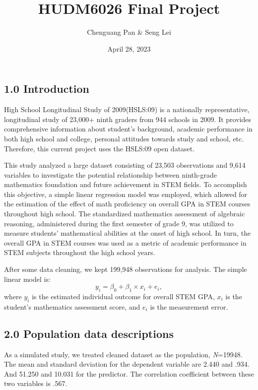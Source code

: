 \documentclass[
]{article}
\title{HUDM6026 Final Project}
\author{Chenguang Pan \& Seng Lei}
\date{April 28, 2023}
\begin{document}
\maketitle

\hypertarget{introduction}{%
\subsection{1.0 Introduction}\label{introduction}}

High School Longitudinal Study of 2009(HSLS:09) is a nationally
representative, longitudinal study of 23,000+ ninth graders from 944
schools in 2009. It provides comprehensive information about student's
background, academic performance in both high school and college,
personal attitudes towards study and school, etc. Therefore, this
current project uses the HSLS:09 open dataset.

This study analyzed a large dataset consisting of 23,503 observations
and 9,614 variables to investigate the potential relationship between
ninth-grade mathematics foundation and future achievement in STEM
fields. To accomplish this objective, a simple linear regression model
was employed, which allowed for the estimation of the effect of math
proficiency on overall GPA in STEM courses throughout high school. The
standardized mathematics assessment of algebraic reasoning, administered
during the first semester of grade 9, was utilized to measure students'
mathematical abilities at the onset of high school. In turn, the overall
GPA in STEM courses was used as a metric of academic performance in STEM
subjects throughout the high school years.

After some data cleaning, we kept 199,948 observations for analysis. The
simple linear model is: \[y_i = \beta_0 + \beta_1\times x_i + e_i ,\]
where \(y_i\) is the estimated individual outcome for overall STEM GPA,
\(x_i\) is the student's mathematics assessment score, and \(e_i\) is
the measurement error.

\hypertarget{population-data-descriptions}{%
\subsection{2.0 Population data
descriptions}\label{population-data-descriptions}}

As a simulated study, we treated cleaned dataset as the population,
\emph{N}=19948. The mean and standard deviation for the dependent
variable are 2.440 and .934. And 51.250 and 10.031 for the predictor.
The correlation coefficient between these two variables is .567.
\end{document}
